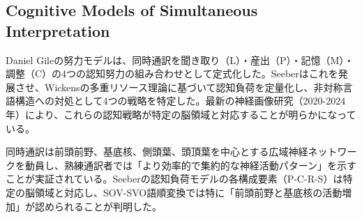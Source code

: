 \subsection{Cognitive Models of Simultaneous Interpretation}

Daniel Gileの努力モデルは、同時通訳を聞き取り（L）・産出（P）・記憶（M）・調整（C）の4つの認知努力の組み合わせとして定式化した。Seeberはこれを発展させ、Wickensの多重リソース理論に基づいて認知負荷を定量化し、非対称言語構造への対処として4つの戦略を特定した。最新の神経画像研究（2020-2024年）により、これらの認知戦略が特定の脳領域と対応することが明らかになっている。

同時通訳は前頭前野、基底核、側頭葉、頭頂葉を中心とする広域神経ネットワークを動員し、熟練通訳者では「より効率的で集約的な神経活動パターン」を示すことが実証されている。Seeberの認知負荷モデルの各構成要素（P-C-R-S）は特定の脳領域と対応し、SOV-SVO語順変換では特に「前頭前野と基底核の活動増加」が認められることが判明した。 